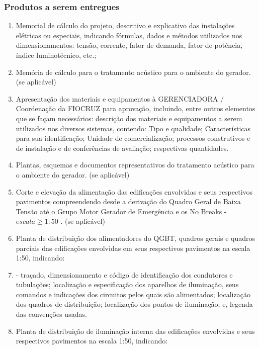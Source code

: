 \subsubsection{Produtos a serem entregues}
	\begin{enumerate}
	
	\item Memorial de cálculo do projeto, descritivo e explicativo das instalações elétricas ou especiais, indicando fórmulas, dados e métodos utilizados nos dimensionamentos: tensão, corrente, fator de demanda, fator de potência, índice luminotécnico, etc.;

	\item Memória de cálculo para o tratamento acústico para o ambiente do gerador. (se aplicável)

	\item Apresentação dos materiais e equipamentos à GERENCIADORA / Coordenação da FIOCRUZ para aprovação, incluindo, entre outros elementos que se façam necessários: descrição dos materiais e equipamentos a serem utilizados nos diversos sistemas, contendo: Tipo e qualidade; Características para sua identificação; Unidade de comercialização; processos construtivos e de instalação e de conferências de avaliação; respectivas quantidades.

	\item Plantas, esquemas e documentos representativos do tratamento acústico para o ambiente do gerador. (se aplicável)

	\item Corte e elevação da alimentação das edificações envolvidas e seus respectivos pavimentos compreendendo desde a derivação do Quadro Geral de Baixa Tensão até o Grupo Motor Gerador de Emergência e os No Breaks - $escala \geq 1:50$ . (se aplicável)

	\item Planta de distribuição dos alimentadores do QGBT, quadros gerais e quadros parciais das edificações envolvidas em seus  respectivos pavimentos na escala 1:50, indicando: 

	\item - traçado, dimensionamento e código de identificação dos condutores e tubulações; localização e especificação dos aparelhos de iluminação, seus comandos e indicações dos circuitos pelos quais são alimentados; localização dos quadros de distribuição; localização dos pontos de iluminação; e, legenda das convenções usadas.

	\item Planta de distribuição de iluminação interna das edificações envolvidas e seus  respectivos pavimentos na escala 1:50, indicando: 


\end{enumerate}
